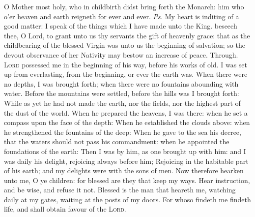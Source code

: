 \introit
{} O Mother most holy, who in childbirth didst bring forth the Monarch: him who o'er heaven and earth reigneth for ever and ever. \textit{Ps.} My heart is inditing of a good matter: I speak of the things which I have made unto the King.
\collect
{} beseech thee, O Lord, to grant unto us thy servants the gift of heavenly grace: that as the childbearing of the blessed Virgin was unto us the beginning of salvation; so the devout observance of her Nativity may bestow an increase of peace. Through.
 \textsc{Lord} possessed me in the beginning of his way, before his works of old. I was set up from everlasting, from the beginning, or ever the earth was. When there were no depths, I was brought forth; when there were no fountains abounding with water. Before the mountains were settled, before the hills was I brought forth: While as yet he had not made the earth, nor the fields, nor the highest part of the dust of the world. When he prepared the heavens, I was there: when he set a compass upon the face of the depth: When he established the clouds above: when he strengthened the fountains of the deep: When he gave to the sea his decree, that the waters should not pass his commandment: when he appointed the foundations of the earth: Then I was by him, as one brought up with him: and I was daily his delight, rejoicing always before him; Rejoicing in the habitable part of his earth; and my delights were with the sons of men. Now therefore hearken unto me, O ye children: for blessed are they that keep my ways. Hear instruction, and be wise, and refuse it not. Blessed is the man that heareth me, watching daily at my gates, waiting at the posts of my doors. For whoso findeth me findeth life, and shall obtain favour of the \textsc{Lord}.
